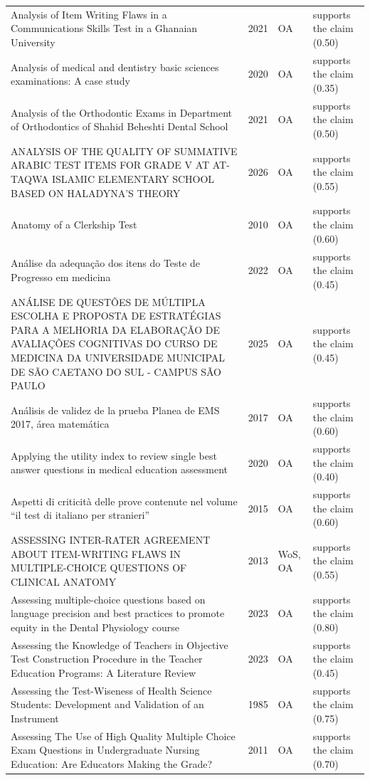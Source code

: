 \begin{longtable}{@{}%
  >{\raggedright\arraybackslash}p{}c%
  >{\raggedright\arraybackslash}p{}%
  >{\raggedright\arraybackslash}p{}@{}}
Analysis of Item Writing Flaws in a Communications Skills Test in a Ghanaian University & 2021 & OA & supports the claim (0.50) \\
Analysis of medical and dentistry basic sciences examinations: A case study & 2020 & OA & supports the claim (0.35) \\
Analysis of the Orthodontic Exams in Department of Orthodontics of Shahid Beheshti Dental School & 2021 & OA & supports the claim (0.50) \\
ANALYSIS OF THE QUALITY OF SUMMATIVE ARABIC TEST ITEMS FOR GRADE V AT AT-TAQWA ISLAMIC ELEMENTARY SCHOOL BASED ON HALADYNA'S THEORY & 2026 & OA & supports the claim (0.55) \\
Anatomy of a Clerkship Test & 2010 & OA & supports the claim (0.60) \\
Análise da adequação dos itens do Teste de Progresso em medicina & 2022 & OA & supports the claim (0.45) \\
ANÁLISE DE QUESTÕES DE MÚLTIPLA ESCOLHA E PROPOSTA DE ESTRATÉGIAS PARA A MELHORIA DA ELABORAÇÃO DE AVALIAÇÕES COGNITIVAS DO CURSO DE MEDICINA DA UNIVERSIDADE MUNICIPAL DE SÃO CAETANO DO SUL - CAMPUS SÃO PAULO & 2025 & OA & supports the claim (0.45) \\
Análisis de validez de la prueba Planea de EMS 2017, área matemática & 2017 & OA & supports the claim (0.60) \\
Applying the utility index to review single best answer questions in medical education assessment & 2020 & OA & supports the claim (0.40) \\
Aspetti di criticità delle prove contenute nel volume ``il test di italiano per stranieri'' & 2015 & OA & supports the claim (0.60) \\
ASSESSING INTER-RATER AGREEMENT ABOUT ITEM-WRITING FLAWS IN MULTIPLE-CHOICE QUESTIONS OF CLINICAL ANATOMY & 2013 & WoS, OA & supports the claim (0.55) \\
Assessing multiple-choice questions based on language precision and best practices to promote equity in the Dental Physiology course & 2023 & OA & supports the claim (0.80) \\
Assessing the Knowledge of Teachers in Objective Test Construction Procedure in the Teacher Education Programs: A Literature Review & 2023 & OA & supports the claim (0.45) \\
Assessing the Test-Wiseness of Health Science Students: Development and Validation of an Instrument & 1985 & OA & supports the claim (0.75) \\
Assessing The Use of High Quality Multiple Choice Exam Questions in Undergraduate Nursing Education: Are Educators Making the Grade? & 2011 & OA & supports the claim (0.70) \\

\end{longtable}
